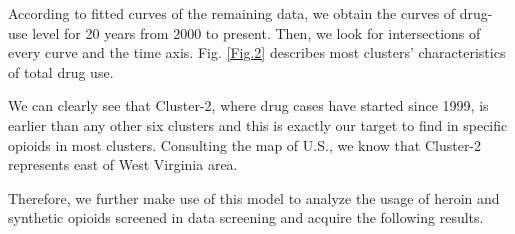 \documentclass[12pt]{article}
\begin{document}

According to fitted curves of the remaining data, we obtain the curves of drug-use level for 20 years from 2000 to present. Then, we look for intersections of every curve and the time axis. Fig. \ref{Fig.2} describes most clusters’ characteristics of total drug use.

We can clearly see that Cluster-2, where drug cases have started since 1999, is earlier than any other six clusters and this is exactly our target to find in specific opioids in most clusters. Consulting the map of U.S., we know that Cluster-2 represents east of West Virginia area.

Therefore, we further make use of this model to analyze the usage of heroin and synthetic opioids screened in data screening and acquire the following results.
\end{document}
